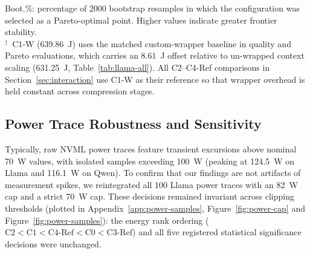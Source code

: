 \documentclass[sigconf,nonacm]{acmart}
\begin{document}
\begin{table}[htbp]
\caption{Three-Objective Pareto Frontier at 4096 Tokens (2000 Bootstrap Resamples)}
\label{tab:pareto3}
\centering\small
{}
\begin{minipage}{\columnwidth}\vspace{2pt}\footnotesize
Boot.\%: percentage of 2000 bootstrap resamples in which the configuration was
selected as a Pareto-optimal point. Higher values indicate greater frontier stability.\\
$^\dagger$~C1-W (639.86~J) uses the matched custom-wrapper baseline in quality and Pareto evaluations,
which carries an 8.61~J offset relative to un-wrapped context scaling (631.25~J, Table~\ref{tab:llama-all}).
All C2--C4-Ref comparisons in Section~\ref{sec:interaction} use C1-W as their reference
so that wrapper overhead is held constant across compression stages.
\end{minipage}
\end{table}

\subsection{Power Trace Robustness and Sensitivity}
\label{sec:robustness}

Typically, raw NVML power traces feature transient excursions above nominal 70~W values, with isolated samples exceeding 100~W (peaking at 124.5~W on Llama and 116.1~W on Qwen). To confirm that our findings are not artifacts of measurement spikes, we reintegrated all 100 Llama power traces with an 82~W cap and a strict 70~W cap. These decisions remained invariant across clipping thresholds (plotted in Appendix~\ref{app:power-samples}, Figure~\ref{fig:power-cap} and Figure~\ref{fig:power-samples}): the energy rank ordering ($\text{C2} < \text{C1} < \text{C4-Ref} < \text{C0} < \text{C3-Ref}$) and all five registered statistical significance decisions were unchanged.
\end{document}
